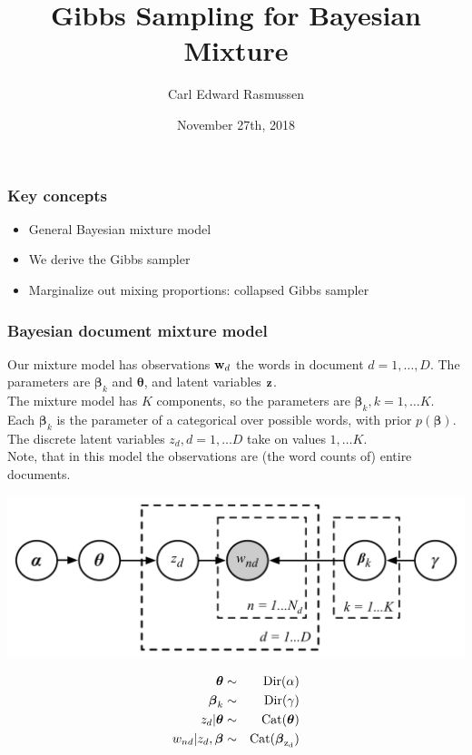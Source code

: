 

\title{Gibbs Sampling for Bayesian Mixture}
\author{Carl Edward Rasmussen}
\date{November 27th, 2018}




\begin{frame}
\titlepage
\end{frame}


\begin{frame}
\frametitle{Key concepts}

\begin{itemize}
\item General Bayesian mixture model
\item We derive the Gibbs sampler
\item Marginalize out mixing proportions: collapsed Gibbs sampler
\end{itemize}

\end{frame}


\begin{frame}
\frametitle{Bayesian document mixture model}

Our mixture model has observations ${\bf w}_d$ the words in document
$d=1,\ldots,D$. The parameters are $\boldsymbol\beta_k$ and $\boldsymbol\theta$, and latent variables ${\bf z}$.\\[1ex]

The mixture model has $K$ components, so the parameters are
$\boldsymbol\beta_k, k=1,\ldots K$. Each $\boldsymbol\beta_k$ is the
parameter of a categorical over possible words, with prior
$p(\boldsymbol\beta)$. The discrete latent variables
$z_d, d=1,\ldots D$ take on values $1,\dots
K$.\\[1ex]

Note, that in this model the observations are (the word counts of)
entire documents.

\begin{minipage}{0.7\linewidth}
\centerline{\includegraphics[width=0.9\linewidth]{bayes_mix_categorical_model}}
\end{minipage}
\begin{minipage}{0.29\linewidth}
{\small
\begin{eqnarray*}
\boldsymbol{\theta} & \sim & \mathrm{Dir}(\alpha) \\
\boldsymbol{\beta}_k & \sim & \mathrm{Dir}(\gamma) \\
z_d | \boldsymbol{\theta} & \sim & \rm{Cat}(\boldsymbol{\theta})\\
w_{nd} | z_d, \boldsymbol{\beta} & \sim & \rm{Cat}(\boldsymbol{\beta}_{z_d})
\end{eqnarray*}
}
\end{minipage}
\end{frame}



